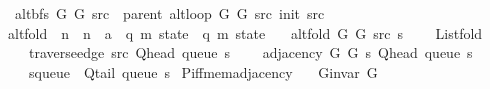 \begin{isabellebody}
\ \ {\isachardoublequoteopen}alt{\isacharunderscore}{\kern0pt}bfs\ G{}\ G{}\ src\ {\isasymequiv}\ parent\ {\isacharparenleft}{\kern0pt}alt{\isacharunderscore}{\kern0pt}loop\ G{}\ G{}\ src\ {\isacharparenleft}{\kern0pt}init\ src{\isacharparenright}{\kern0pt}{\isacharparenright}{\kern0pt}{\isachardoublequoteclose}\isanewline
\isanewline
{}\isamarkupfalse%
\ alt{\isacharunderscore}{\kern0pt}fold\ {\isacharcolon}{\kern0pt}{\isacharcolon}{\kern0pt}\ {\isachardoublequoteopen}{\isacharprime}{\kern0pt}n\ {\isasymRightarrow}\ {\isacharprime}{\kern0pt}n\ {\isasymRightarrow}\ {\isacharprime}{\kern0pt}a\ {\isasymRightarrow}\ {\isacharparenleft}{\kern0pt}{\isacharprime}{\kern0pt}q{\isacharcomma}{\kern0pt}\ {\isacharprime}{\kern0pt}m{\isacharparenright}{\kern0pt}\ state\ {\isasymRightarrow}\ {\isacharparenleft}{\kern0pt}{\isacharprime}{\kern0pt}q{\isacharcomma}{\kern0pt}\ {\isacharprime}{\kern0pt}m{\isacharparenright}{\kern0pt}\ state{\isachardoublequoteclose}\ \isanewline
\ \ {\isachardoublequoteopen}alt{\isacharunderscore}{\kern0pt}fold\ G{}\ G{}\ src\ s\ {\isasymequiv}\isanewline
\ \ \ List{\isachardot}{\kern0pt}fold\isanewline
\ \ \ \ {\isacharparenleft}{\kern0pt}traverse{\isacharunderscore}{\kern0pt}edge\ src\ {\isacharparenleft}{\kern0pt}Q{\isacharunderscore}{\kern0pt}head\ {\isacharparenleft}{\kern0pt}queue\ s{\isacharparenright}{\kern0pt}{\isacharparenright}{\kern0pt}{\isacharparenright}{\kern0pt}\isanewline
\ \ \ \ {\isacharparenleft}{\kern0pt}adjacency\ G{}\ G{}\ s\ {\isacharparenleft}{\kern0pt}Q{\isacharunderscore}{\kern0pt}head\ {\isacharparenleft}{\kern0pt}queue\ s{\isacharparenright}{\kern0pt}{\isacharparenright}{\kern0pt}{\isacharparenright}{\kern0pt}\isanewline
\ \ \ \ {\isacharparenleft}{\kern0pt}s{\isasymlparr}queue\ {\isacharcolon}{\kern0pt}{\isacharequal}{\kern0pt}\ Q{\isacharunderscore}{\kern0pt}tail\ {\isacharparenleft}{\kern0pt}queue\ s{\isacharparenright}{\kern0pt}{\isasymrparr}{\isacharparenright}{\kern0pt}{\isachardoublequoteclose}%
\isadelimdocument
%
\endisadelimdocument
%
\isatagdocument
%
\isamarkuptrue%
%
\isamarkuptrue%
%
\endisatagdocument
{\isafolddocument}%
%
\isadelimdocument
%
\endisadelimdocument
{}\isamarkupfalse%
\ P{\isacharunderscore}{\kern0pt}iff{\isacharunderscore}{\kern0pt}mem{\isacharunderscore}{\kern0pt}adjacency{\isacharcolon}{\kern0pt}\isanewline
\ \ \ {\isachardoublequoteopen}G{\isachardot}{\kern0pt}invar\ G{\isachardoublequoteclose}\isanewline

\end{isabellebody}
